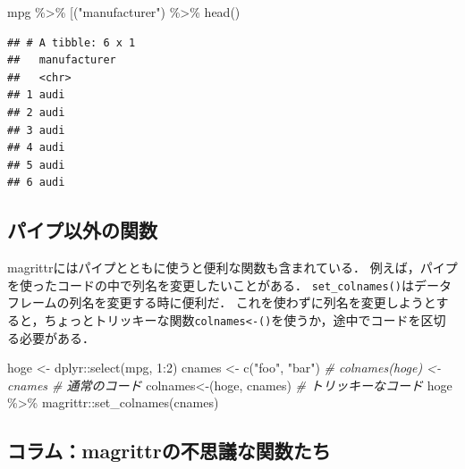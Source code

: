 \documentclass[
]{article}
\newenvironment{Shaded}{\begin{snugshade}}{\end{snugshade}}
\newcommand{\AttributeTok}[1]{\textcolor[rgb]{0.77,0.63,0.00}{#1}}
\newcommand{\CommentTok}[1]{\textcolor[rgb]{0.56,0.35,0.01}{\textit{#1}}}
\newcommand{\DecValTok}[1]{\textcolor[rgb]{0.00,0.00,0.81}{#1}}
\newcommand{\FunctionTok}[1]{\textcolor[rgb]{0.00,0.00,0.00}{#1}}
\newcommand{\NormalTok}[1]{#1}
\newcommand{\OtherTok}[1]{\textcolor[rgb]{0.56,0.35,0.01}{#1}}
\newcommand{\SpecialCharTok}[1]{\textcolor[rgb]{0.00,0.00,0.00}{#1}}
\newcommand{\StringTok}[1]{\textcolor[rgb]{0.31,0.60,0.02}{#1}}
\begin{document}
\begin{Shaded}
\begin{Highlighting}[]
\NormalTok{mpg }\SpecialCharTok{\%\textgreater{}\%} \StringTok{\textasciigrave{}}\AttributeTok{[}\StringTok{\textasciigrave{}}\NormalTok{(}\StringTok{"manufacturer"}\NormalTok{)  }\SpecialCharTok{\%\textgreater{}\%} \FunctionTok{head}\NormalTok{()}
\end{Highlighting}
\end{Shaded}

\begin{verbatim}
## # A tibble: 6 x 1
##   manufacturer
##   <chr>       
## 1 audi        
## 2 audi        
## 3 audi        
## 4 audi        
## 5 audi        
## 6 audi
\end{verbatim}

\hypertarget{ux30d1ux30a4ux30d7ux4ee5ux5916ux306eux95a2ux6570}{%
\subsection{パイプ以外の関数}\label{ux30d1ux30a4ux30d7ux4ee5ux5916ux306eux95a2ux6570}}

magrittrにはパイプとともに使うと便利な関数も含まれている．
例えば，パイプを使ったコードの中で列名を変更したいことがある．
\texttt{set\_colnames()}はデータフレームの列名を変更する時に便利だ．
これを使わずに列名を変更しようとすると，ちょっとトリッキーな関数\texttt{colnames\textless{}-()}を使うか，途中でコードを区切る必要がある．

\begin{Shaded}
\begin{Highlighting}[]
\NormalTok{hoge }\OtherTok{\textless{}{-}}\NormalTok{ dplyr}\SpecialCharTok{::}\FunctionTok{select}\NormalTok{(mpg, }\DecValTok{1}\SpecialCharTok{:}\DecValTok{2}\NormalTok{)}
\NormalTok{cnames }\OtherTok{\textless{}{-}} \FunctionTok{c}\NormalTok{(}\StringTok{"foo"}\NormalTok{, }\StringTok{"bar"}\NormalTok{)}
 \CommentTok{\# colnames(hoge) \textless{}{-} cnames      \# 通常のコード}
\StringTok{\textasciigrave{}}\AttributeTok{colnames\textless{}{-}}\StringTok{\textasciigrave{}}\NormalTok{(hoge, cnames)       }\CommentTok{\# トリッキーなコード}
\NormalTok{hoge }\SpecialCharTok{\%\textgreater{}\%} 
\NormalTok{  magrittr}\SpecialCharTok{::}\FunctionTok{set\_colnames}\NormalTok{(cnames)}
\end{Highlighting}
\end{Shaded}

\hypertarget{ux30b3ux30e9ux30e0magrittrux306eux4e0dux601dux8b70ux306aux95a2ux6570ux305fux3061}{%
\subsection{コラム：magrittrの不思議な関数たち}\label{ux30b3ux30e9ux30e0magrittrux306eux4e0dux601dux8b70ux306aux95a2ux6570ux305fux3061}}
\end{document}
